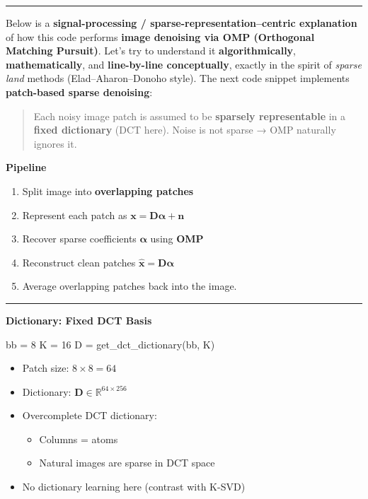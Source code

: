 \documentclass[11pt]{article}
\providecommand{\tightlist}{%
      \setlength{\itemsep}{0pt}\setlength{\parskip}{0pt}}
\newenvironment{Shaded}{}{}
\newcommand{\DecValTok}[1]{\textcolor[rgb]{0.25,0.63,0.44}{{#1}}}
\newcommand{\NormalTok}[1]{{#1}}
\newcommand{\OperatorTok}[1]{\textcolor[rgb]{0.40,0.40,0.40}{{#1}}}
\begin{document}
\begin{center}\rule{0.5\linewidth}{0.5pt}\end{center}

Below is a \textbf{signal-processing / sparse-representation--centric
explanation} of how this code performs \textbf{image denoising via OMP
(Orthogonal Matching Pursuit)}. Let's try to understand it
\textbf{algorithmically}, \textbf{mathematically}, and
\textbf{line-by-line conceptually}, exactly in the spirit of
\emph{sparse land} methods (Elad--Aharon--Donoho style). The next code
snippet implements \textbf{patch-based sparse denoising}:

\begin{quote}
Each noisy image patch is assumed to be \textbf{sparsely representable}
in a \textbf{fixed dictionary} (DCT here). Noise is not sparse → OMP
naturally ignores it.
\end{quote}

\textbf{Pipeline}

\begin{enumerate}
\def\labelenumi{\arabic{enumi}.}
\tightlist
\item
  Split image into \textbf{overlapping patches}
\item
  Represent each patch as
  \(\mathbf{x} = \mathbf{D}\boldsymbol{\alpha} + \mathbf{n}\)
\item
  Recover sparse coefficients \(\boldsymbol{\alpha}\) using \textbf{OMP}
\item
  Reconstruct clean patches
  \(\hat{\mathbf{x}} = \mathbf{D}\boldsymbol{\alpha}\)
\item
  Average overlapping patches back into the image.
\end{enumerate}

\begin{center}\rule{0.5\linewidth}{0.5pt}\end{center}

\textbf{Dictionary: Fixed DCT Basis}

\begin{Shaded}
\begin{Highlighting}[]
\NormalTok{bb }\OperatorTok{=} \DecValTok{8}
\NormalTok{K }\OperatorTok{=} \DecValTok{16}
\NormalTok{D }\OperatorTok{=}\NormalTok{ get\_dct\_dictionary(bb, K)}
\end{Highlighting}
\end{Shaded}

\begin{itemize}
\tightlist
\item
  Patch size: \(8 \times 8 = 64\)
\item
  Dictionary: \(\mathbf{D} \in \mathbb{R}^{64 \times 256}\)
\item
  Overcomplete DCT dictionary:

  \begin{itemize}
  \tightlist
  \item
    Columns = atoms
  \item
    Natural images are sparse in DCT space
  \end{itemize}
\item
  No dictionary learning here (contrast with K-SVD)
\end{itemize}
\end{document}
